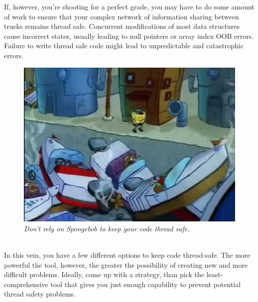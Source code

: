 \documentclass[11pt]{article}
\begin{document}
If, however, you're shooting for a perfect grade, you may have to do some amount of work to ensure that your complex network of information sharing between trucks remains thread safe. Concurrent modifications of most data structures cause incorrect states, usually leading to null pointers or array index OOB errors. Failure to write thread safe code might lead to unpredictable and catastrophic errors.\\
\begin{figure}[h]
\centerline{\includegraphics[scale=0.65]{collision.png}} 
\caption{\em{Don't rely on Spongebob to keep your code thread safe.}}
\end{figure}
\\In this vein, you have a few different options to keep code thread-safe. The more powerful the tool, however, the greater the possibility of creating new and more difficult problems. Ideally, come up with a strategy, than pick the least-comprehensive tool that gives you just enough capability to prevent potential thread safety problems.
\end{document}
